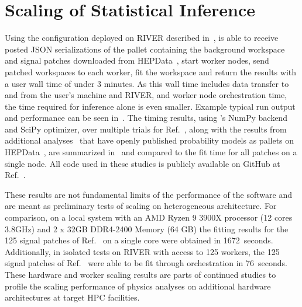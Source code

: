 \section{Scaling of Statistical Inference}\label{sec:results}
%
Using the \funcX{} configuration deployed on RIVER described in~, \funcX{} is able to receive posted JSON serializations of the \pyhf{} pallet containing the background workspace and signal patches downloaded from HEPData~\cite{ATLAS_SUSY_1Lbb_pallet}, start \funcX{} worker nodes, send patched workspaces to each worker, fit the workspace and return the results with a user wall time of under 3 minutes.
As this wall time includes data transfer to and from the user's machine and RIVER, and worker node orchestration time, the time required for inference alone is even smaller.
Example typical run output and performance can be seen in~.
The timing results, using \pyhf{}'s NumPy backend and SciPy optimizer, over multiple trials for Ref.~\cite{ATLAS_SUSY_1Lbb_pallet}, along with the results from additional analyses~\cite{SUSY-2018-09,SUSY-2018-04} that have openly published probability models as \pyhf{} pallets on HEPData~\cite{ATLAS_SUSY_SS3L_pallet,ATLAS_SUSY_staus_pallet}, are summarized in~ and compared to the fit time for all patches on a single node.
All code used in these studies is publicly available on GitHub at Ref.~\cite{study_code}.



These results are not fundamental limits of the performance of the software and are meant as preliminary tests of scaling on heterogeneous architecture.
For comparison, on a local system with an AMD Ryzen 9 3900X processor (12 cores 3.8GHz) and 2 x 32GB DDR4-2400 Memory (64 GB) the fitting results for the 125 signal patches of Ref.~\cite{ATLAS_SUSY_1Lbb_pallet} on a single core were obtained in 1672~seconds.
Additionally, in isolated tests on RIVER with access to 125 workers, the 125 signal patches of Ref.~\cite{ATLAS_SUSY_1Lbb_pallet} were able to be fit through \funcX{} orchestration in 76~seconds.
These hardware and worker scaling results are parts of continued studies to profile the scaling performance of physics analyses on additional hardware architectures at target HPC facilities.
